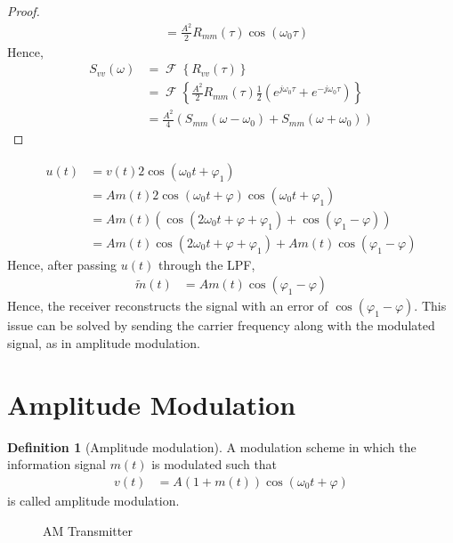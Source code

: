 \documentclass[titlepage, fleqn, a4paper, 12pt, twoside]{article}
\theoremstyle{definition}
\newtheorem{definition}{Definition}
\theoremstyle{theorem}
\renewcommand{\tilde}{\widetilde}
\DeclareMathOperator{\FT}{\mathcal{F}}
\begin{document}
\begin{proof}
\begin{align*}
		&= \frac{A^2}{2} R_{m m}(\tau) \cos(\omega_0 \tau)
	\end{align*}
	Hence,
	\begin{align*}
		S_{v v}(\omega) &= \FT\left\{ R_{v v}(\tau) \right\}\\
		&= \FT\left\{ \frac{A^2}{2} R_{m m}(\tau) \frac{1}{2} \left( e^{j \omega_0 \tau} + e^{-j \omega_0 \tau} \right) \right\}\\
		&= \frac{A^2}{4} \left( S_{m m}(\omega - \omega_0) + S_{m m}(\omega + \omega_0) \right)
	\end{align*}
\end{proof}

\begin{align*}
	u(t) &= v(t) 2 \cos(\omega_0 t + \varphi_1)\\
	&= A m(t) 2 \cos(\omega_0 t + \varphi) \cos(\omega_0 t + \varphi_1)\\
	&= A m(t) \left( \cos(2 \omega_0 t + \varphi + \varphi_1) + \cos(\varphi_1 - \varphi) \right)\\
	&= A m(t) \cos(2 \omega_0 t + \varphi + \varphi_1) + A m(t) \cos(\varphi_1 - \varphi)
\end{align*}
Hence, after passing $u(t)$ through the LPF,
\begin{align*}
	\tilde{m}(t) &= A m(t) \cos(\varphi_1 - \varphi)
\end{align*}
Hence, the receiver reconstructs the signal with an error of $\cos(\varphi_1 - \varphi)$.
This issue can be solved by sending the carrier frequency along with the modulated signal, as in amplitude modulation.

\section{Amplitude Modulation}

\begin{definition}[Amplitude modulation]
	A modulation scheme in which the information signal $m(t)$ is modulated such that
	\begin{align*}
		v(t) &= A (1 + m(t)) \cos(\omega_0 t + \varphi)
	\end{align*}
	is called amplitude modulation.
\end{definition}

\begin{figure}[H]
	\centering
	\caption{AM Transmitter}
	\label{fig:AM_transmitter}
\end{figure}
\end{document}
